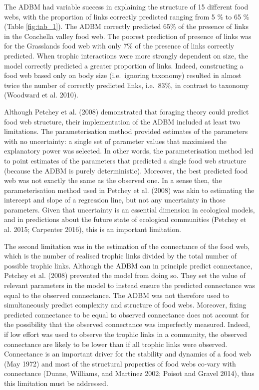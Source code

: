 \documentclass{article}
\begin{document}
The ADBM had variable success in explaining the structure of 15
different food webs, with the proportion of links correctly predicted
ranging from 5 \% to 65 \% (Table \ref{fig:tab_1}). The ADBM correctly
predicted 65\% of the presence of links in the Coachella valley food
web. The poorest prediction of presence of links was for the Grasslands
food web with only 7\% of the presence of links correctly predicted.
When trophic interactions were more strongly dependent on size, the
model correctly predicted a greater proportion of links. Indeed,
constructing a food web based only on body size (i.e.~ignoring taxonomy)
resulted in almost twice the number of correctly predicted links,
i.e.~83\%, in contrast to taxonomy (Woodward et al. 2010).

Although Petchey et al. (2008) demonstrated that foraging theory could
predict food web structure, their implementation of the ADBM included at
least two limitations. The parameterisation method provided estimates of
the parameters with no uncertainty: a single set of parameter values
that maximised the explanatory power was selected. In other words, the
parameterisation method led to point estimates of the parameters that
predicted a single food web structure (because the ADBM is purely
deterministic). Moreover, the best predicted food web was not exactly
the same as the observed one. In a sense then, the parameterisation
method used in Petchey et al. (2008) was akin to estimating the
intercept and slope of a regression line, but not any uncertainty in
those parameters. Given that uncertainty is an essential dimension in
ecological models, and in predictions about the future state of
ecological communities (Petchey et al. 2015; Carpenter 2016), this is an
important limitation.

The second limitation was in the estimation of the connectance of the
food web, which is the number of realised trophic links divided by the
total number of possible trophic links. Although the ADBM can in
principle predict connectance, Petchey et al. (2008) prevented the model
from doing so. They set the value of relevant parameters in the model to
instead ensure the predicted connectance was equal to the observed
connectance. The ADBM was not therefore used to simultaneously predict
complexity and structure of food webs. Moreover, fixing predicted
connectance to be equal to observed connectance does not account for the
possibility that the observed connectance was imperfectly measured.
Indeed, if low effort was used to observe the trophic links in a
community, the observed connectance are likely to be lower than if all
trophic links were observed. Connectance is an important driver for the
stability and dynamics of a food web (May 1972) and most of the
structural properties of food webs co-vary with connectance (Dunne,
Williams, and Martinez 2002; Poisot and Gravel 2014), thus this
limitation must be addressed.
\end{document}
